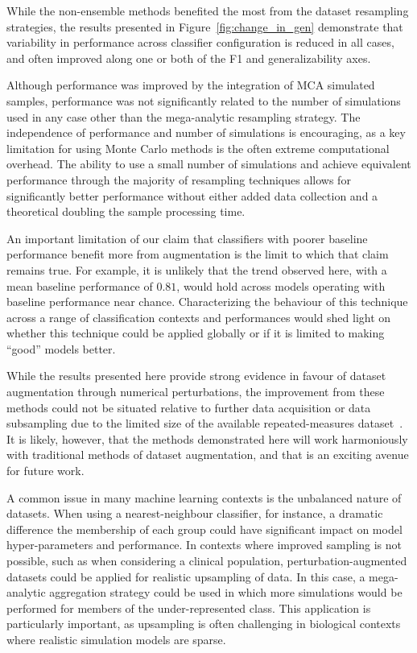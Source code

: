 \documentclass[10pt]{SelfArx} %
\begin{document}
While the non-ensemble methods benefited the most from the dataset resampling strategies, the results presented in
Figure~\ref{fig:change_in_gen} demonstrate that variability in performance across classifier configuration is reduced
in all cases, and often improved along one or both of the F1 and generalizability axes.

Although performance was improved by the integration of MCA simulated samples, performance was not significantly
related to the number of simulations used in any case other than the mega-analytic resampling strategy. The
independence of performance and number of simulations is encouraging, as a key limitation for using Monte Carlo methods
is the often extreme computational overhead. The ability to use a small number of simulations and achieve equivalent
performance through the majority of resampling techniques allows for significantly better performance without either
added data collection and a theoretical doubling the sample processing time.

An important limitation of our claim that classifiers with poorer baseline performance benefit more from augmentation
is the limit to which that claim remains true. For example, it is unlikely that the trend observed here, with a mean
baseline performance of $0.81$, would hold across models operating with baseline performance near chance.
Characterizing the behaviour of this technique across a range of classification contexts and performances would shed
light on whether this technique could be applied globally or if it is limited to making ``good'' models better.

While the results presented here provide strong evidence in favour of dataset augmentation through numerical
perturbations, the improvement from these methods could not be situated relative to further data acquisition or data
subsampling due to the limited size of the available repeated-measures dataset~\cite{Kiar2020-yz}. It is likely,
however, that the methods demonstrated here will work harmoniously with traditional methods of dataset augmentation,
and that is an exciting avenue for future work.

A common issue in many machine learning contexts is the unbalanced nature of datasets. When using a nearest-neighbour
classifier, for instance, a dramatic difference the membership of each group could have significant impact on model
hyper-parameters and performance. In contexts where improved sampling is not possible, such as when considering a
clinical population, perturbation-augmented datasets could be applied for realistic upsampling of data. In this case, a
mega-analytic aggregation strategy could be used in which more simulations would be performed for members of the
under-represented class. This application is particularly important, as upsampling is often challenging in biological
contexts where realistic simulation models are sparse.
\end{document}
